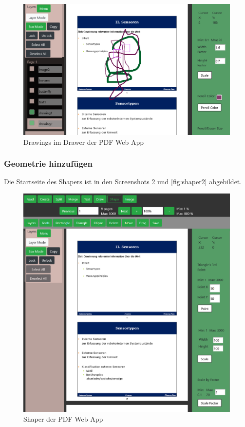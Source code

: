 \begin{figure}[!htbp]
	\centering
	\includegraphics[width=1\textwidth]{"images/drawing.png"}
	\caption{Drawings im Drawer der PDF Web App}
	\label{fig:drawing}
\end{figure}


\subsubsection{Geometrie hinzufügen}
Die Startseite des Shapers ist in den Screenshots \ref{fig:shaper} und \ref{fig:shaper2} abgebildet. 

\begin{figure}[!htbp]
	\centering
	\includegraphics[width=1\textwidth]{"images/shaper.png"}
	\caption{Shaper der PDF Web App}
	\label{fig:shaper}
\end{figure}

